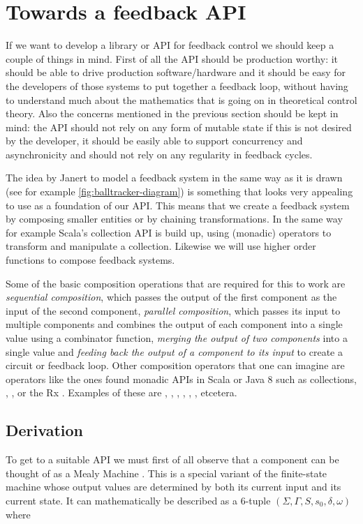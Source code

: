 \section{Towards a feedback API}
If we want to develop a library or API for feedback control we should keep a couple of things in mind. First of all the API should be production worthy: it should be able to drive production software/hardware and it should be easy for the developers of those systems to put together a feedback loop, without having to understand much about the mathematics that is going on in theoretical control theory. Also the concerns mentioned in the previous section should be kept in mind: the API should not rely on any form of mutable state if this is not desired by the developer, it should be easily able to support concurrency and asynchronicity and should not rely on any regularity in feedback cycles.

The idea by Janert to model a feedback system in the same way as it is drawn (see for example \cref{fig:balltracker-diagram}) is something that looks very appealing to use as a foundation of our API. This means that we create a feedback system by composing smaller entities or by chaining transformations. In the same way for example Scala's collection API is build up, using (monadic) operators to transform and manipulate a collection. Likewise we will use higher order functions to compose feedback systems.

Some of the basic composition operations that are required for this to work are \textit{sequential composition}, which passes the output of the first component as the input of the second component, \textit{parallel composition}, which passes its input to multiple components and combines the output of each component into a single value using a combinator function, \textit{merging the output of two components} into a single value and \textit{feeding back the output of a component to its input} to create a circuit or feedback loop. Other composition operators that one can imagine are operators like the ones found monadic APIs in Scala or Java 8 such as collections, , ,  or the Rx \obs. Examples of these are , , , , , , etcetera.

\subsection{Derivation}
To get to a suitable API we must first of all observe that a component can be thought of as a Mealy Machine \cite{mealy1955-mealymachine}. This is a special variant of the finite-state machine whose output values are determined by both its current input and its current state. It can mathematically be described as a 6-tuple $(\Sigma, \Gamma, S, s_0, \delta, \omega)$ \cite{carroll1989-theoryoffiniteautomata} where

